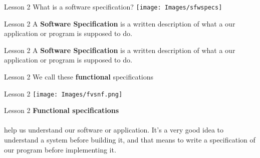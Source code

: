 \documentclass[aspectratio=1610]{beamer}
\begin{document}
\begin{frame}{Lesson 2}{}
\Huge{What is a software specification?}
\texttt{[image: Images/sfwspecs]}
\end{frame}


\begin{frame}{Lesson 2}{}
\Huge
    A \textbf{Software Specification} is a 
    \alert{written} description of what a our application or program 
    is supposed to do.
\end{frame}




\begin{frame}{Lesson 2}{}
\Huge
    A \textbf{Software Specification} is a
    \alert{written} description of what a our application or program
    is supposed to do.
\end{frame}


\begin{frame}{Lesson 2}{}
\Huge
    We call these \alert{\textbf{functional}} specifications 
\end{frame}

%

\begin{frame}{Lesson 2}{}
\texttt{[image: Images/fvsnf.png]}
\end{frame}




\begin{frame}{Lesson 2}{}
\LARGE
\textbf{Functional specifications}\\~\\
help us understand our software or application. It’s a very good idea to understand a
system before building it, and that means to write a specification of our program
\alert{before} implementing it.
\end{frame}
\end{document}
